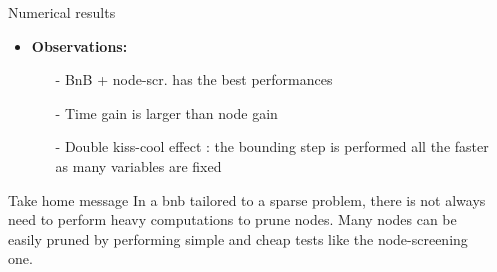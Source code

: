 \documentclass[final]{beamer}
\newlength{\sepwid}
\newlength{\onecolwid}
\newcommand{\emphone}[1]{{\color{norange}#1}}
\begin{document}
\begin{frame}[t]
\begin{columns}[t]
\begin{column}{\onecolwid}
\begin{block}{Numerical results}
        
        \begin{itemize}
            \item \hspace{0.1in} \textbf{Observations:}
            \begin{itemize}
                \normalsize \justifying \item[-] \hspace*{0.1in} BnB + node-scr. has the best performances
                \item[-] \hspace*{0.1in} Time gain is larger than node gain
                \item[-] \hspace*{0.1in} Double kiss-cool effect : the bounding step is performed all the faster as \emphone{many variables are fixed}
            \end{itemize}
        \end{itemize}
        \vspace*{1em}
        \begin{alertblock}{Take home message}
            In a \gls{bnb} tailored to a sparse problem, there is not always need to perform heavy computations to prune nodes.
            Many nodes can be \emphone{easily pruned} by performing \emphone{simple and cheap tests} like the node-screening one.
        \end{alertblock}
    \end{block}
\end{column} 

\begin{column}{\sepwid}\end{column}

\end{columns}
\end{frame}
\end{document}
